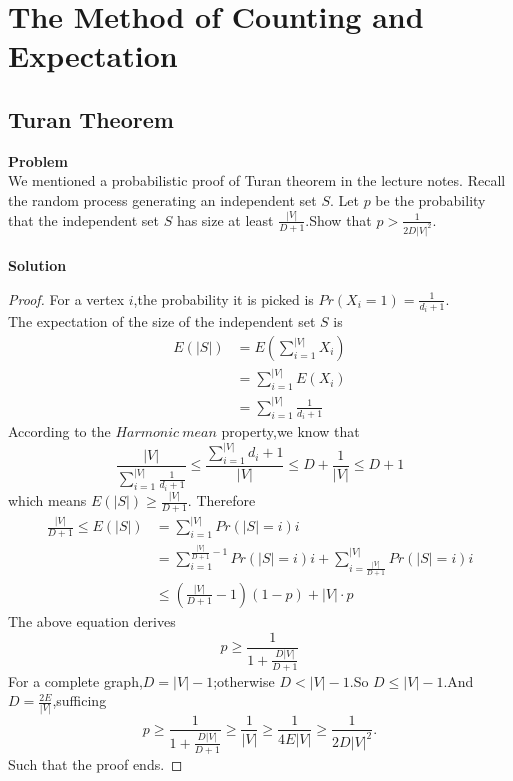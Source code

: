 \chapter{The Method of Counting and Expectation}
	
	\section{Turan Theorem}
	\textbf{Problem}\\
	We mentioned a probabilistic proof of Turan theorem in the lecture notes. Recall the random process generating an independent set $S$. Let $p$ be the probability that the independent set $S$ has size at least $\frac{|V|}{D+1}$.Show that $p > \frac{1}{2D|V|^2}$.\\\\
	\textbf{Solution}\\
	\begin{proof}
		For a vertex $i$,the probability it is picked is $Pr(X_i=1) = \frac{1}{d_i+1}$.\\
	The expectation of the size of the independent set $S$ is
	\begin{equation*}
		\begin{split}
			E(|S|)
			&=E \left(\sum_{i=1}^{|V|}X_i \right)\\
			&= \sum_{i = 1}^{|V|} E(X_i)\\
			&= \sum_{i = 1}^{|V|}\frac{1}{d_i + 1}
		\end{split}
	\end{equation*}
	According to the $Harmonic \ mean$ property,we know that
	\[
	\frac{|V|}{\sum_{i = 1}^{|V|}\frac{1}{d_i+1}} \leq \frac{\sum_{i=1}^{|V|}d_i+1}{|V|}\leq D + \frac{1}{|V|} \leq D+1
	\]
	which means $E(|S|) \geq \frac{|V|}{D + 1}$.
	Therefore
	\begin{equation*}
		\begin{split}
			\frac{|V|}{D + 1} \leq E(|S|)
			&=\sum_{i = 1}^{|V|}Pr(|S| = i)i\\
			&= \sum_{i = 1}^{\frac{|V|}{D+1} - 1}Pr(|S| = i)i + \sum_{i = \frac{|V|}{D+1}}^{|V|}Pr(|S| = i)i\\
			&\leq \left(\frac{|V|}{D+1} - 1\right)(1 - p) + |V| \cdot p
		\end{split}
	\end{equation*}
	The above equation derives
	\[
		p \geq \frac{1}{1 + \frac{D |V|}{D + 1}}
	\]
	For a complete graph,$D = |V| - 1$;otherwise $D < |V| - 1$.So $D \leq |V| - 1$.And $D = \frac{2E}{|V|}$,sufficing
	\[
	p \geq \frac{1}{1 + \frac{D |V|}{D + 1}} \geq \frac{1}{|V|} \geq \frac{1}{4E|V|} \geq \frac{1}{2D|V|^2}.
	\]
	Such that the proof ends.
	\end{proof}
	
